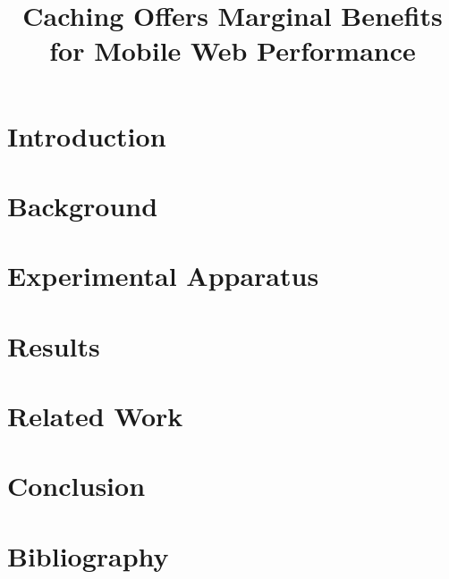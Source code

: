 \documentclass[letterpaper,10pt,twocolumn]{article}
\title{\vspace{0.04in}Caching Offers Marginal Benefits for Mobile Web Performance}
\author{\authorthing}
\begin{document}
   \date{}
   \maketitle
   \thispagestyle{empty}

\leading{12pt}
\setlength{\textfloatsep}{10pt plus 1pt minus 10pt} %

\abstract{}

\section{Introduction}
\label{sec:intro}


\section{Background}
\label{sec:background}


\section{Experimental Apparatus}
\label{sec:apparatus}


\section{Results}
\label{sec:results}


\section{Related Work}
\label{sec:related_work}


\section{Conclusion}
\label{sec:conclusion}


\section{Bibliography}
\label{sec:bibliography}


\end{document}
